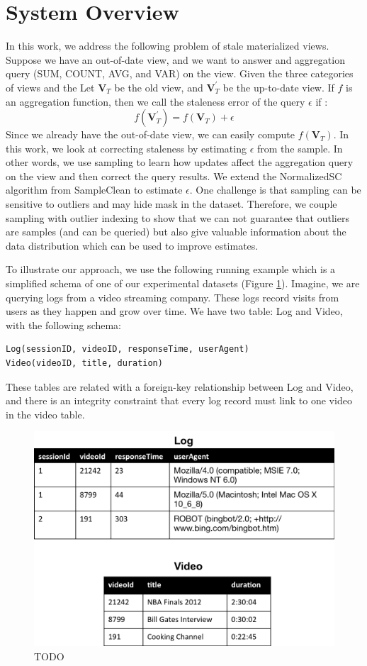 \section{System Overview}
In this work, we address the following problem of stale materialized views.
Suppose we have an out-of-date view, and we want to answer and aggregation 
query (SUM, COUNT, AVG, and VAR) on the view.
Given the three categories of views and the 
Let $\textbf{V}_{T}$ be the old view, and $\textbf{V}_{T}^{'}$ be
the up-to-date view. If $f$ is an aggregation function, then we call
the staleness error of the query $\epsilon$ if :
\[
f(\textbf{V}_{T}^{'})=f(\textbf{V}_{T})+\epsilon
\]
Since we already have the out-of-date view, we can easily compute
$f(\textbf{V}_{T})$. 
In this work, we look at correcting staleness by estimating $\epsilon$ 
from the sample.
In other words, we use sampling to learn how updates affect the aggregation query on the view
and then correct the query results.
We extend the NormalizedSC algorithm from SampleClean to estimate $\epsilon$.
One challenge is that sampling can be sensitive to outliers and may hide mask in the dataset.
Therefore, we couple sampling with outlier indexing to show that we can not guarantee that outliers 
are samples (and can be queried) but also give valuable information about the data distribution
which can be used to improve estimates.

To illustrate our approach, we use the following running example which is a 
simplified schema of one of our experimental datasets (Figure \ref{example}).
Imagine, we are querying logs from a video streaming company. 
These logs record visits from users as they happen and grow over time.
We have two table: Log and Video, with the following schema:
\begin{lstlisting}
Log(sessionID, videoID, responseTime, userAgent)
Video(videoID, title, duration)
\end{lstlisting}
These tables are related with a foreign-key relationship between
Log and Video, and there is an integrity constraint that every log
record must link to one video in the video table.

\begin{figure}[h]
\label{example}
\centering
 \includegraphics[width=\columnwidth]{figs/sample-clean-example.png}
 \caption{TODO}
\end{figure}

